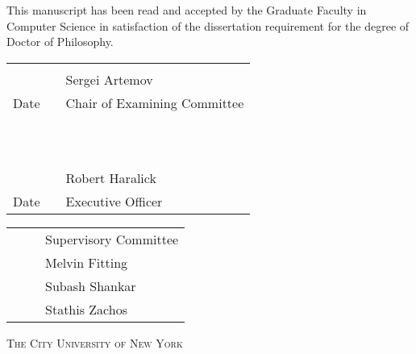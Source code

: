 \begin{center}

\vspace{.5in}
This manuscript has been read and accepted by the Graduate Faculty 
in Computer Science in satisfaction of the dissertation requirement for the degree of Doctor of Philosophy.
\end{center}

\vspace{1.0in}

\begin{tabular}{p{1.75in}p{0.5in}p{3.5in}}
\hrulefill                          & &\hrulefill \\
~	  			     & & Sergei Artemov\\
Date                                & & Chair of Examining Committee\\
~                                   & & \\

~                                   & & \\
\hrulefill                          & &\hrulefill \\
~                                   & & Robert Haralick\\
Date                                & & Executive Officer\\
\end{tabular}

\vspace{0.75in}

\begin{tabular}{p{1.75in}p{0.5in}p{3.5in}}
~ 				& &  Supervisory Committee \\
~ 				& &  Melvin Fitting \\
~				& &  Subash Shankar \\
~				& &  Stathis Zachos \\
\end{tabular}


\vspace{\fill}
\begin{center}
\textsc{The City University of New York}
\end{center}